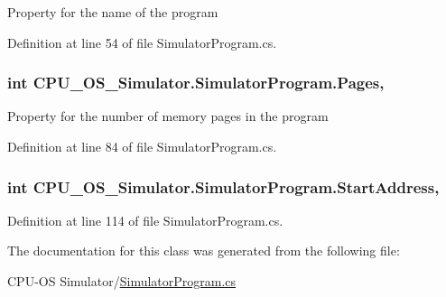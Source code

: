Property for the name of the program 



Definition at line 54 of file Simulator\+Program.\+cs.

\hypertarget{class_c_p_u___o_s___simulator_1_1_simulator_program_acb651f746bd98040b6b7a06637b83fa3}{}
\subsubsection[{Pages}]{\setlength{\rightskip}{0pt plus 5cm}int C\+P\+U\+\_\+\+O\+S\+\_\+\+Simulator.\+Simulator\+Program.\+Pages\hspace{0.3cm}{\ttfamily [get]}, {\ttfamily [set]}}\label{class_c_p_u___o_s___simulator_1_1_simulator_program_acb651f746bd98040b6b7a06637b83fa3}


Property for the number of memory pages in the program 



Definition at line 84 of file Simulator\+Program.\+cs.

\hypertarget{class_c_p_u___o_s___simulator_1_1_simulator_program_afe1316429a20c7e678f8e4c0654dbacd}{}
\subsubsection[{Start\+Address}]{\setlength{\rightskip}{0pt plus 5cm}int C\+P\+U\+\_\+\+O\+S\+\_\+\+Simulator.\+Simulator\+Program.\+Start\+Address\hspace{0.3cm}{\ttfamily [get]}, {\ttfamily [set]}}\label{class_c_p_u___o_s___simulator_1_1_simulator_program_afe1316429a20c7e678f8e4c0654dbacd}


Definition at line 114 of file Simulator\+Program.\+cs.



The documentation for this class was generated from the following file\+:\begin{DoxyCompactItemize}
\item 
C\+P\+U-\/\+O\+S Simulator/\hyperlink{_simulator_program_8cs}{Simulator\+Program.\+cs}\end{DoxyCompactItemize}
